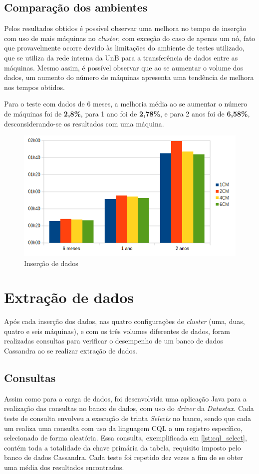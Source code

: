 \subsection{Comparação dos ambientes}

Pelos resultados obtidos é possível observar uma melhora no tempo de inserção com uso de mais máquinas no \emph{cluster}, com exceção do caso de apenas um nó, fato que provavelmente ocorre devido às limitações do ambiente de testes utilizado, que se utiliza da rede interna da UnB para a transferência de dados entre as máquinas. Mesmo assim, é possível observar que ao se aumentar o volume dos dados, um aumento do número de máquinas apresenta uma tendência de melhora nos tempos obtidos.

Para o teste com dados de 6 meses, a melhoria média ao se aumentar o número de máquinas foi de \textbf{2,8\%}, para 1 ano foi de \textbf{2,78\%}, e para 2 anos foi de \textbf{6,58\%}, desconsiderando-se os resultados com uma máquina.

\begin{figure}[!htb]
	\centering
	\includegraphics[width=1\textwidth]{figuras/graphinsert.png}
	\caption{Inserção de dados}
	\label{fig:graph_insert}
\end{figure}

\section{Extração de dados}
Após cada inserção dos dados, nas quatro configurações de \emph{cluster} (uma, duas, quatro e seis máquinas), e com os três volumes diferentes de dados, foram realizadas consultas para verificar o desempenho de um banco de dados Cassandra ao se realizar extração de dados.

\subsection{Consultas}
Assim como para a carga de dados, foi desenvolvida uma aplicação Java para a realização das consultas no banco de dados, com uso do \emph{driver} da \emph{Datastax}. Cada teste de consulta envolveu a execução de trinta \emph{Selects} no banco, sendo que cada um realiza uma consulta com uso da linguagem CQL a um registro específico, selecionado de forma aleatória. Essa consulta, exemplificada em \ref{lst:cql_select}, contém toda a totalidade da chave primária da tabela, requisito imposto pelo banco de dados Cassandra. Cada teste foi repetido dez vezes a fim de se obter uma média dos resultados encontrados.

